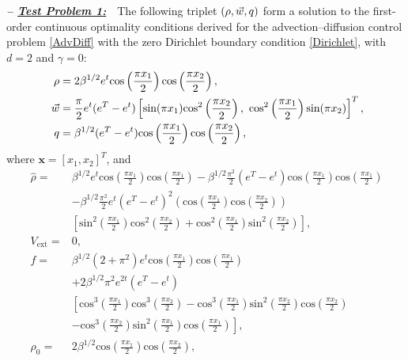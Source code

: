 \textbf{\emph{-- \underline{Test Problem 1:}}}~~The following triplet $(\rho,\vec{w},q)$ form a solution to the first-order continuous optimality conditions derived for the advection--diffusion control problem \eqref{AdvDiff} with the zero Dirichlet boundary condition \eqref{Dirichlet}, with $d=2$ and $\gamma =0$:
\begin{align*}
\ \rho={}&2 \beta^{1/2}e^{t}\text{cos}\left(\frac{\pi{}x_1}{2}\right)\text{cos}\left(\frac{\pi{}x_2}{2}\right), \\
\ \vec{w}={}&\frac{\pi}{2} e^{t}(e^{T}-e^{t})\left[\text{sin}(\pi{}x_1)\text{cos}^2\left(\frac{\pi{}x_2}{2}\right),~\text{cos}^2\left(\frac{\pi{}x_1}{2}\right)\text{sin}(\pi{}x_2)\right]^T, \\
\ \adj={}&\beta^{1/2}(e^{T}-e^{t})\text{cos}\left(\frac{\pi{}x_1}{2}\right)\text{cos}\left(\frac{\pi{}x_2}{2}\right),
\end{align*}
where $\boldsymbol{x}=[x_1,x_2]^T$, and
\begin{align*}
\ \widehat{\rho}={}&\beta^{1/2} e^{t}\text{cos}\left(\frac{\pi{}x_1}{2}\right)\text{cos}\left(\frac{\pi{}x_1}{2}\right) -\beta^{1/2}\frac{\pi^2}{2}(e^{T}-e^{t})\text{cos}\left(\frac{\pi{}x_1}{2}\right)\text{cos}\left(\frac{\pi{}x_1}{2}\right) \\
\ &-\beta^{1/2}\frac{\pi^2}{2}e^{t}(e^{T}-e^{t})^2\left(\text{cos}\left(\frac{\pi{}x_1}{2}\right)\text{cos}\left(\frac{\pi{}x_2}{2}\right)\right)\\
&\left[\text{sin}^2\left(\frac{\pi{}x_1}{2}\right)\text{cos}^2\left(\frac{\pi{}x_2}{2}\right) +\text{cos}^2\left(\frac{\pi{}x_1}{2}\right)\text{sin}^2\left(\frac{\pi{}x_2}{2}\right)\right], \\
\ V_{\text{ext}}={}&0, \\
\ f={}&\beta^{1/2}\left(2+\pi^2\right)e^{t}\text{cos}\left(\frac{\pi{}x_1}{2}\right)\text{cos}\left(\frac{\pi{}x_1}{2}\right) \\
\ &+ 2\beta^{1/2}\pi^2 e^{2t}(e^{T}-e^{t})\\
&\left[\text{cos}^3\left(\frac{\pi{}x_1}{2}\right)\text{cos}^3\left(\frac{\pi{}x_2}{2}\right)
-\text{cos}^3\left(\frac{\pi{}x_1}{2}\right)\text{sin}^2\left(\frac{\pi{}x_2}{2}\right)\text{cos}\left(\frac{\pi{}x_2}{2}\right) \right. \\
& \left. -\text{cos}^3\left(\frac{\pi{}x_2}{2}\right)\text{sin}^2\left(\frac{\pi{}x_1}{2}\right)\text{cos}\left(\frac{\pi{}x_1}{2}\right)\right], \\
\ \rho_{0}={}&2 \beta^{1/2}\text{cos}\left(\frac{\pi{}x_1}{2}\right)\text{cos}\left(\frac{\pi{}x_2}{2}\right),
\end{align*}

